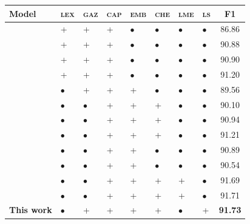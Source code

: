 \documentclass[11pt]{article}
\newcommand{\lll}{\textsc{lex}}
\newcommand{\ggg}{\textsc{gaz}}
\newcommand{\ccc}{\textsc{cap}}
\newcommand{\chhh}{\textsc{che}}
\newcommand{\eee}{\textsc{emb}}
\newcommand{\mmm}{\textsc{lme}}
\newcommand{\sss}{\textsc{ls}}
\begin{document}
	\begin{table}[!h]
		\begin{center}
			\setlength{\tabcolsep}{1mm}  
			\begin{tabular}{|l|lllllll|c|}
				\hline \textbf{Model} & \lll & \ggg & \ccc &\eee & \chhh & \mmm & \sss  & \textbf{F1} \\ 
				\hline
				\cite{finkel2005incorporating} 		& \textsc{+}& \textsc{+}& \textsc{+} & $\bullet$&$\bullet$&$\bullet$& $\bullet$	& 86.86 \\
				\cite{ratinov2009design} 			& \textsc{+}& \textsc{+}& \textsc{+} & $\bullet$&$\bullet$&$\bullet$&$\bullet$	& 90.88 \\
				\cite{lin2009phrase} 				& \textsc{+}& \textsc{+}& \textsc{+} & $\bullet$&$\bullet$&$\bullet$&$\bullet$	& 90.90\\
				\cite{luo-2015} &\textsc{+}& \textsc{+}& \textsc{+} & $\bullet$&$\bullet$&$\bullet$&$\bullet$	& 91.20 \\
				
				\hline
				\cite{collobert2011natural} 		& $\bullet$ & \textsc{+}& \textsc{+}& \textsc{+} &$\bullet$&$\bullet$&$\bullet$	& 89.56\\
				\cite{huang2015bidirectional} 		& $\bullet$&$\bullet$ & \textsc{+}& \textsc{+}& \textsc{+} & $\bullet$ & $\bullet$	& 90.10\\
				\cite{lample2016neural} 			& $\bullet$&$\bullet$ & \textsc{+}& \textsc{+}& \textsc{+} & $\bullet$ & $\bullet$	& 90.94 \\
				\cite{ma2016end} 				& $\bullet$&$\bullet$ & \textsc{+}& \textsc{+}& \textsc{+} & $\bullet$ & $\bullet$	& 91.21\\	 
				\cite{shen2017deep} 			& $\bullet$&$\bullet$ & \textsc{+}& \textsc{+} & $\bullet$ & $\bullet$ & $\bullet$	& 90.89 \\
				\cite{strubell2017fast} 			& $\bullet$&$\bullet$ & \textsc{+}& \textsc{+} & $\bullet$ & $\bullet$ & $\bullet$	& 90.54 \\				
				\cite{tran2017named}  			& $\bullet$&$\bullet$ & \textsc{+}& \textsc{+} & \textsc{+}& \textsc{+} & $\bullet$ 	& 91.69 \\
				\cite{liu2017empower} 			& $\bullet$&$\bullet$ & \textsc{+}& \textsc{+} & \textsc{+}& \textsc{+} & $\bullet$ 	&  91.71 \\
				\hline					
				\textbf{This work} 				& $\bullet$& \textsc{+}& \textsc{+} & \textsc{+}& \textsc{+} & $\bullet$ 	& \textsc{+}	& \bf 91.73 \\
				\hline
				

\end{tabular}
\end{center}
\end{table}
\end{document}
